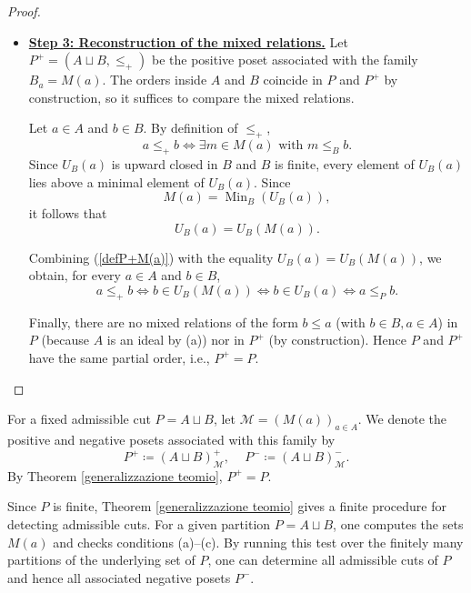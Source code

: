 \begin{proof}
\begin{itemize}
 \textit{Surjectivity:} Let $m' \in M(a')$. From $a \leq_P a' \leq_Pm'$, we have $m' \in U_B(a)$. Since $P$ is finite, every element of a nonempty subset lies above at least one minimal element of that subset. Applied to $U_B(a)$, this gives an element $m \in M(a)$ such that $m \leq_Bm'$. By uniqueness, $\varphi_{a,a'}(m)=m'$. 

 Therefore $\varphi_{a,a'}$ is a bijection satisfying \[m \leq_B \varphi_{a,a'}(m)\] for every $m \in M(a)$. Hence the family $(B_a)_{a \in A}$, with $B_a=M(a)$, satisfies condition $(ii)$ of Section \ref{Ladkani's construction}.

 \item \textbf{\underline{Step 3: Reconstruction of the mixed relations.}}
 Let $P^+=(A \sqcup B, \leq_+)$ be the positive poset associated with the family $B_a=M(a)$. The orders inside $A$ and $B$ coincide in $P$ and $P^+$ by construction, so it suffices to compare the mixed relations.

 Let $a \in A$ and $b \in B$. By definition of $\leq_+$, 
 \begin{equation} \label{defP+M(a)} 
 a \leq_+b \iff \exists m \in M(a) \text{ with } m \leq_Bb.
 \end{equation}
 Since $U_B(a)$ is upward closed in $B$ and $B$ is finite, every element of $U_B(a)$ lies above a minimal element of $U_B(a)$. Since \[M(a) = \operatorname{Min}_B(U_B(a)),\] it follows that \[U_B(a)=U_B(M(a)).\]

 Combining (\ref{defP+M(a)}) with the equality $U_B(a)=U_B(M(a))$, we obtain, for every $a \in A$ and $b \in B$, \[a \leq_+b \iff b \in U_B(M(a)) \iff b \in U_B(a) \iff a \leq_Pb.\]

 Finally, there are no mixed relations of the form $b \leq a$ (with $b \in B, a \in A$) in $P$ (because $A$ is an ideal by (a)) nor in $P^+$ (by construction). Hence $P$ and $P^+$ have the same partial order, i.e., $P^+=P$.

 \end{itemize}
\end{proof}
For a fixed admissible cut $P=A \sqcup B$, let $\mathcal{M}=(M(a))_{a \in A}$. We denote the positive and negative posets associated with this family by \[P^+ \coloneq (A \sqcup B)^+_{\mathcal{M}}, \,\,\,\,\,\,\, P^- \coloneq (A \sqcup B)^-_{\mathcal{M}}.\] By Theorem \ref{generalizzazione teomio}, $P^+=P$.

Since $P$ is finite, Theorem \ref{generalizzazione teomio} gives a finite procedure for detecting admissible cuts. For a given partition $P=A \sqcup B$, one computes the sets $M(a)$ and checks conditions (a)--(c). By running this test over the finitely many partitions of the underlying set of $P$, one can determine all admissible cuts of $P$ and hence all associated negative posets $P^-$.

